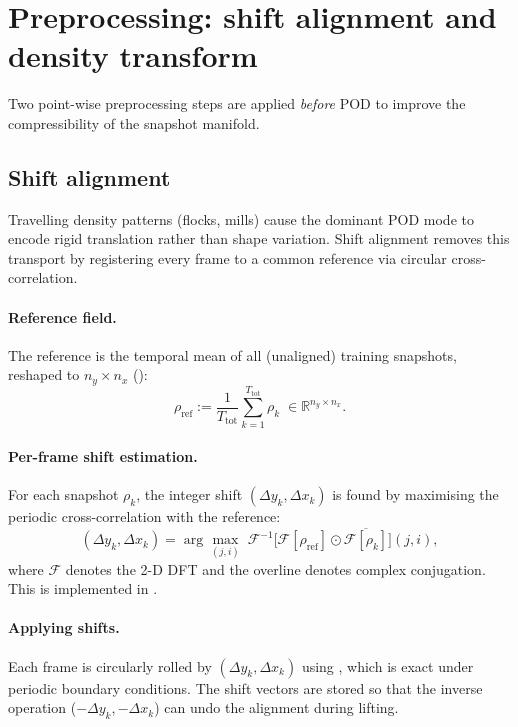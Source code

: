 \documentclass{report}
\theoremstyle{plain}
\theoremstyle{remark}
\numberwithin{equation}{section}              %
\begin{document}
%
\section{Preprocessing: shift alignment and density transform}
\label{sec:preprocessing}

Two point-wise preprocessing steps are applied \emph{before} POD to improve
the compressibility of the snapshot manifold.

\subsection{Shift alignment}
\label{subsec:shift_align}

Travelling density patterns (flocks, mills) cause the dominant POD mode to
encode rigid translation rather than shape variation.  Shift alignment
removes this transport by registering every frame to a common reference via
circular cross-correlation.

\paragraph{Reference field.}
The reference is the temporal mean of all (unaligned) training snapshots,
reshaped to $n_y\times n_x$ ():
\[
  \rho_{\mathrm{ref}}
  := \frac{1}{T_{\mathrm{tot}}}
     \sum_{k=1}^{T_{\mathrm{tot}}}
     \rho_k \;\in\mathbb{R}^{n_y\times n_x}.
\]

\paragraph{Per-frame shift estimation.}
For each snapshot $\rho_k$, the integer shift
$(\Delta y_k,\Delta x_k)$ is found by maximising the periodic
cross-correlation with the reference:
\begin{equation}
  (\Delta y_k,\Delta x_k)
  = \arg\max_{(j,i)}\;
    \mathcal{F}^{-1}\!\bigl[
      \mathcal{F}[\rho_{\mathrm{ref}}]
      \odot
      \overline{\mathcal{F}[\rho_k]}
    \bigr](j,i),
  \label{eq:shift_xcorr}
\end{equation}
where $\mathcal{F}$ denotes the 2-D DFT and the overline denotes complex
conjugation.  This is implemented in
.

\paragraph{Applying shifts.}
Each frame is circularly rolled by $(\Delta y_k,\Delta x_k)$ using
, which is exact under periodic boundary conditions.  The shift
vectors are stored so that the inverse operation ($-\Delta y_k,-\Delta x_k$)
can undo the alignment during lifting.
\end{document}
